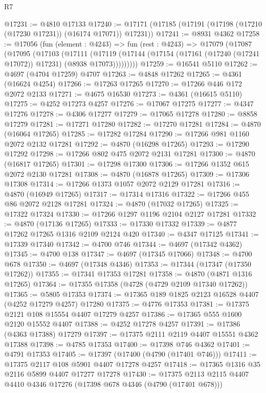 \begin{lexlean}{R7}
\begin{coremodule}
@17231 := @4810 @17133
@17240 := @17171 (@17185 (@17191 (@17198 (@17210 (@17230 @17231)) (@16174 @17071)) @17231))
@17241 := @8931 @4362
@17258 := @17056
    (fun (element : @4243) =>
    fun (rest : @4243) =>
    @17079
      (@17087
        (@17095
          (@17103
            (@17111
              (@17119
                (@17144 (@17154 (@17161 (@17240 (@17241 @17072)) @17231) (@8938 @17073)))))))))
@17259 := @16541 @5110
@17262 := @4697 (@4704 @17259) @4707
@17263 := @4848 @17262
@17265 := @4361 (@16624 @4254)
@17266 := @17263 @17265
@17270 := @17266 @446 @172 @2072 @2133
@17271 := @4675 @16530
@17273 := @4361 (@16615 @5110)
@17275 := @4252 @17273 @4257
@17276 := @17067 @17275
@17277 := @4347 @17276
@17278 := @4306 @17277
@17279 := @17065 @17278
@17280 := @8858 @17279
@17281 := @17271 @17280
@17282 := @17270 @17281
@17284 := @4870 (@16064 @17265)
@17285 := @17282 @17284
@17290 := @17266 @981 @1160 @2072 @2132 @17281
@17292 := @4870 (@16298 @17265)
@17293 := @17290 @17292
@17298 := @17266 @802 @475 @2072 @2131 @17281
@17300 := @4870 (@16817 @17265)
@17301 := @17298 @17300
@17306 := @17266 @1352 @615 @2072 @2130 @17281
@17308 := @4870 (@16878 @17265)
@17309 := @17306 @17308
@17314 := @17266 @1373 @1057 @2072 @2129 @17281
@17316 := @4870 (@16949 @17265)
@17317 := @17314 @17316
@17322 := @17266 @455 @86 @2072 @2128 @17281
@17324 := @4870 (@17032 @17265)
@17325 := @17322 @17324
@17330 := @17266 @1297 @1196 @2104 @2127 @17281
@17332 := @4870 (@17136 @17265)
@17333 := @17330 @17332
@17339 := @4877 @17262 @17265 @1316 @2109 @2124 @420
@17340 := @4347 @17125
@17341 := @17339 @17340
@17342 := @4700 @746
@17344 := @4697 (@17342 @4362)
@17345 := @4700 @138
@17347 := @4697 (@17345 @17066)
@17348 := @4700 @678
@17350 := @4697 (@17348 @4346)
@17353 := @17344 (@17347 (@17350 @17262))
@17355 := @17341 @17353 @17281
@17358 := @4870 (@4871 @1316 @17265)
@17364 := @17355 @17358 (@4728 (@4729 @2109 @17340 @17262))
@17365 := @5805 @17353
@17374 := @17365 @189 @1825 @2123 @16528 @4407 (@4252 @17279 @4257) @17280
@17375 := @4776 @17353
@17381 := @17375 @2121 @108 @15554 @4407 @17279 @4257
@17386 := @17365 @555 @1600 @2120 @15552 @4407
@17388 := @4252 @17278 @4257
@17391 := @17386 (@4363 @17388) @17279
@17397 := @17375 @2111 @2119 @4407 @15551 @4362 @17388
@17398 := @4785 @17353
@17400 := @17398 @746 @4362
@17401 := @4791 @17353
@17405 := @17397 (@17400 (@4790 (@17401 @746)))
@17411 := @17375 @2117 @108 @5901 @4407 @17278 @4257
@17418 := @17365 @1316 @35 @2116 @5899 @4407 @17277 @17278
@17430 := @17375 @2113 @2115 @4407 @4410 @4346 @17276 (@17398 @678 @4346 (@4790 (@17401 @678)))

\end{coremodule}
\end{lexlean}
